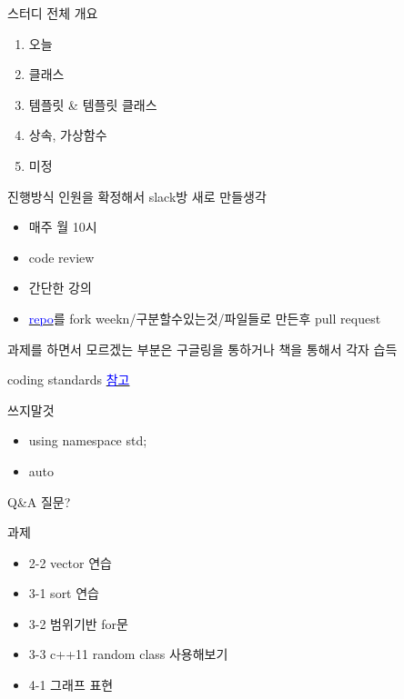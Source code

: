 \documentclass[10pt]{beamer}
\begin{document}
\begin{frame}{스터디 전체 개요}
    \begin{enumerate}
        \item 오늘
        \item 클래스
        \item 템플릿 \& 템플릿 클래스
        \item 상속, 가상함수
        \item 미정
    \end{enumerate}
\end{frame}

\begin{frame}{진행방식}
    인원을 확정해서 slack방 새로 만들생각

    \begin{itemize}
        \item 매주 월 10시
        \item code review
        \item 간단한 강의
        \item \href{https://github.com/EeeUnS/2020CppStudy}{\textcolor{blue}{repo}}를 fork weekn/구분할수있는것/파일들로 만든후 pull request
    \end{itemize}



    과제를 하면서 모르겠는 부분은 구글링을 통하거나 책을 통해서 각자 습득


\end{frame}    

\begin{frame}{coding standards}
    \href{https://github.com/popekim/dev-docs-ko/blob/master/coding-standards/cpp.md}{\textcolor{blue}{참고}}

    
    쓰지말것
    \begin{itemize}
        \item using namespace  std;
        \item auto
    \end{itemize}
\end{frame}    


\begin{frame}{Q\&A}
    질문?
\end{frame}


\begin{frame}{과제}
    \begin{itemize}
        \item 2-2 vector 연습
        \item 3-1 sort 연습 
        \item 3-2 범위기반 for문
        \item 3-3 c++11 random class 사용해보기
        \item 4-1 그래프 표현
    \end{itemize}
\end{frame}    
\end{document}
